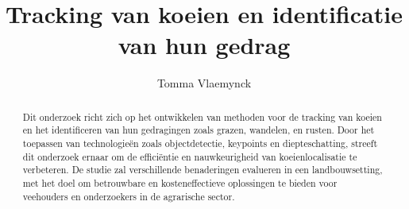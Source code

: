 \documentclass{hogent-article}
\title{Tracking van koeien en identificatie van hun gedrag}
\author{Tomma Vlaemynck}
\begin{document}
\begin{abstract}
  Dit onderzoek richt zich op het ontwikkelen van methoden voor de tracking van koeien en het identificeren van hun gedragingen zoals grazen, wandelen, en rusten. Door het toepassen van technologieën zoals objectdetectie, keypoints en diepteschatting, streeft dit onderzoek ernaar om de efficiëntie en nauwkeurigheid van koeienlocalisatie te verbeteren. De studie zal verschillende benaderingen evalueren in een landbouwsetting, met het doel om betrouwbare en kosteneffectieve oplossingen te bieden voor veehouders en onderzoekers in de agrarische sector.
\end{abstract}

\tableofcontents



\printbibliography[heading=bibintoc]
\end{document}
